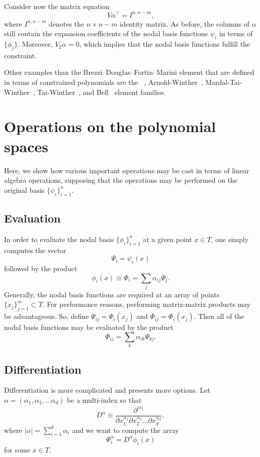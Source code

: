 Consider now the matrix equation
\begin{equation}
\label{eq:extendedvdmsystem}
V \alpha^{\top} = I^{n,n-m},
\end{equation}
where $I^{n,n-m}$ denotes the $n \times n-m$ identity matrix.
As before, the columns of $\alpha$ still contain the expansion coefficients
of the nodal basis functions $\psi_i$ in terms of $\{ \phi_j \}$.
Moreover, $V_2 \alpha = 0$, which implies that the nodal basis functions
fulfill the constraint.

Other examples than the Brezzi--Douglas--Fortin--Marini element
that are defined in terms of constrained polynomials are the
\nedelec~\citep{Nedelec1980}, Arnold-Winther~\citep{ArnoldWinther2002},
Mardal-Tai-Winther~\citep{MardalTaiWinther2002},
Tai-Winther~\citep{TaiWinther2006}, and Bell~\citep{Ciarlet2002}
element families.

\section{Operations on the polynomial spaces}
Here, we show how various important operations may be cast in terms of
linear algebra operations, supposing that the operations may be performed
on the original basis $\{ \psi_i \}_{i=1}^{n}$.

\subsection{Evaluation}
In order to evaluate the nodal basis $\{ \phi_i \}_{i=1}^{n}$ at a
given point $x \in T$, one simply computes the vector
\begin{equation}
\Psi_i = \psi_i(x)
\end{equation}
followed by the product
\begin{equation}
\phi_i(x) \equiv \Phi_i = \sum_j \alpha_{ij} \Psi_j.
\end{equation}
Generally, the nodal basis functions are required at an array of points
$\{ x_j \}_{j=1}^{m} \subset T$.  For performance reasons, performing
matrix-matrix products may be advantageous.  So, define $\Psi_{ij} =
\Psi_i(x_j)$ and $\Phi_{ij} = \Phi_i(x_j)$.  Then all of the nodal
basis functions may be evaluated by the product
\begin{equation}
\Phi_{ij} = \sum_k \alpha_{ik} \Psi_{kj}.
\end{equation}
\subsection{Differentiation}
Differentiation is more complicated and presents more options.
Let $\alpha = ( \alpha_1 , \alpha_2 , \dots \alpha_d )$ be a
multi-index so that
\begin{equation}
D^\alpha \equiv \frac{\partial^{|\alpha|}}{\partial
  x_1^{\alpha_1} \partial x_2^{\alpha_2} \dots \partial x_d^{\alpha_d}},
\end{equation}
where $|\alpha| = \sum_{i=1}^{d} \alpha_i$ and we want
to compute the array
\begin{equation}
\Phi^\alpha_i = D^\alpha \phi_i(x)
\end{equation}
for some $x \in T$.

